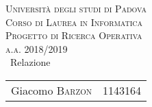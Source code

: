 \begin{titlepage} %
	\begin{center} %

		
		\textsc{\LARGE Università degli studi di Padova}\\[1.5cm]
		
		\textsc{\Large Corso di Laurea in Informatica}\\[0.5cm]
		
		\textsc{\Large Progetto di Ricerca Operativa}\\[0.5cm]
		

		
		\textsc{\large a.a. 2018/2019}\\[0.5cm] %
		
		
		{\huge\ Relazione}\\[0.4cm] %
		
		
	 	\large
			\begin{tabular}{l r}
				Giacomo \textsc{Barzon} & 1143164 \\
			\end{tabular}
	\end{center}
\end{titlepage}
